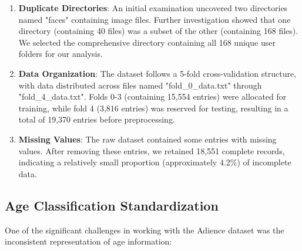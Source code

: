 \documentclass{article}
\begin{document}
\begin{enumerate}
    \item \textbf{Duplicate Directories}: An initial examination uncovered two directories named "faces" containing image files. Further investigation showed that one directory (containing 40 files) was a subset of the other (containing 168 files). We selected the comprehensive directory containing all 168 unique user folders for our analysis.
    
    \item \textbf{Data Organization}: The dataset follows a 5-fold cross-validation structure, with data distributed across files named "fold\_0\_data.txt" through "fold\_4\_data.txt". Folds 0-3 (containing 15,554 entries) were allocated for training, while fold 4 (3,816 entries) was reserved for testing, resulting in a total of 19,370 entries before preprocessing.
    
    \item \textbf{Missing Values}: The raw dataset contained some entries with missing values. After removing these entries, we retained 18,551 complete records, indicating a relatively small proportion (approximately 4.2\%) of incomplete data.
\end{enumerate}

\subsection{Age Classification Standardization}

One of the significant challenges in working with the Adience dataset was the inconsistent representation of age information:
\end{document}
